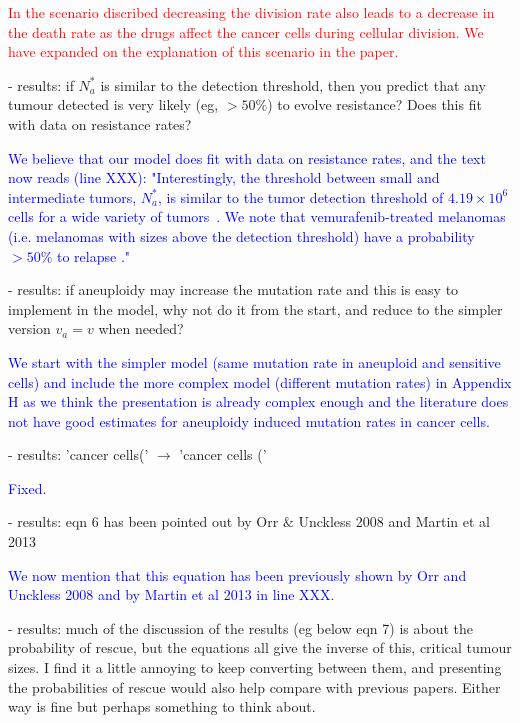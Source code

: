 \documentclass[12pt]{extarticle}
\begin{document}
\textcolor{red}{%
In the scenario discribed decreasing the division rate also leads to a decrease in the death rate as the drugs affect the cancer cells during cellular division. We have expanded on the explanation of this scenario in the paper.
} 

- results: if $N_a^*$ is similar to the detection threshold, then you predict that any tumour detected is very likely (eg, $>50\%$) to evolve resistance? Does this fit with data on resistance rates?

\textcolor{blue}{ %
We believe that our model does fit with data on resistance rates, and the text now reads (line XXX): "Interestingly, the threshold between small and intermediate tumors, $N_a^*$, is similar to the tumor detection threshold of $4.19 \times 10^6$ cells for a wide variety of tumors~\citep{avanzini2019cancer}. We note that vemurafenib-treated melanomas (i.e. melanomas with sizes above the detection threshold) have a probability $>50\%$ to relapse \citep{piejko2023long,handa2022long}."
}

- results: if aneuploidy may increase the mutation rate and this is easy to implement in the model, why not do it from the start, and reduce to the simpler version $v_a=v$ when needed?

\textcolor{blue}{
We start with the simpler model (same mutation rate in aneuploid and sensitive cells) and include the more complex model (different mutation rates) in Appendix H as we think the presentation is already complex enough and the literature does not have good estimates for aneuploidy induced mutation rates in cancer cells.
} 

- results: 'cancer cells(' $\rightarrow$ 'cancer cells ('

\textcolor{blue}{Fixed.} %

- results: eqn 6 has been pointed out by Orr $\&$ Unckless 2008 and Martin et al 2013

\textcolor{blue}{%
We now mention that this equation has been previously shown by Orr and Unckless 2008 and by Martin et al 2013 in line XXX.
} 

- results: much of the discussion of the results (eg below eqn 7) is about the probability of rescue, but the equations all give the inverse of this, critical tumour sizes. I find it a little annoying to keep converting between them, and presenting the probabilities of rescue would also help compare with previous papers. Either way is fine but perhaps something to think about.
\end{document}
